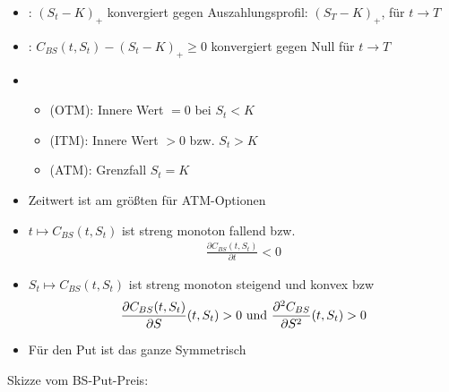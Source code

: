 \begin{itemize}
	\item {}: $(S_t -K)_+$ konvergiert gegen Auszahlungsprofil: $(S_T - K)_+$, für $t \to T$
	\item {}: $C_{BS}(t,S_t) - (S_t - K)_+ \ge 0$ konvergiert gegen Null für $t \to T$
	\item 
	\begin{itemize}
		\item {} (OTM): Innere Wert $=0$ bei $S_t < K$
		\item {} (ITM): Innere Wert $>0$ bzw. $S_t > K$
		\item {} (ATM): Grenzfall $S_t = K$
	\end{itemize}
	\item Zeitwert ist am größten für ATM-Optionen
	\item $t \mapsto C_{BS}(t,S_t)$ ist streng monoton fallend bzw.
	\begin{align*}
		\frac{\partial C_{BS}(t,S_t)}{\partial t} < 0
	\end{align*}
	\item $S_t \mapsto C_{BS}(t,S_t)$ ist streng monoton steigend und konvex bzw
	\begin{align*}
		\frac{\partial C_{BS}(t,S_t)}{\partial S}(t,S_t) > 0 \text{ und } \frac{\partial^2 C_{BS}}{\partial S^2}(t,S_t) > 0
	\end{align*}
	\item Für den Put ist das ganze Symmetrisch
\end{itemize}
Skizze vom BS-Put-Preis:
